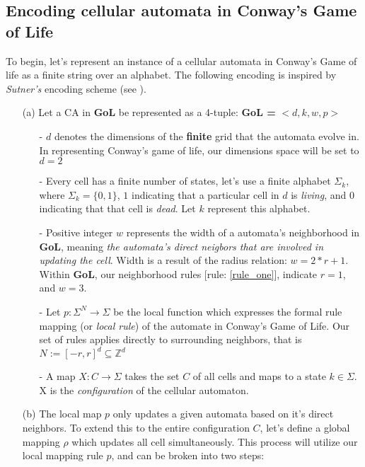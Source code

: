 \documentclass{article}
\theoremstyle{definition}
\theoremstyle{plain}
\theoremstyle{plain}
\begin{document}
\subsection{Encoding cellular automata in Conway's Game of Life}
To begin, let's represent an instance of a cellular automata in Conway's Game of life as a finite string over an alphabet. The following encoding is inspired by \textit{Sutner's} encoding scheme (see \cite{SUTNER199587}).
\begin{enumerate}
  \item[(a)] Let a CA in \textbf{GoL} be represented as a 4-tuple: \textbf{GoL = } $ <d, k, w, p> $
    \begin{enumerate}
      \item[-] $d$ denotes the dimensions of the \textbf{finite} grid that the automata evolve in. In representing Conway's game of life, our dimensions space will be set to $d = 2$
      \item[-] Every cell has a finite number of states, let's use a finite alphabet $\Sigma_k$, where $\Sigma_k = \{0,1\}$, $1$ indicating that a particular cell in $d$ is \textit{living}, and $0$ indicating that that cell is \textit{dead}. Let $k$ represent this alphabet.
      \item[-] Positive integer $w$ represents the width of a automata's neighborhood in \textbf{GoL}, meaning \textit{the automata's direct neigbors that are involved in updating the cell}. Width is a result of the radius relation: $w = 2*r +1$. Within \textbf{GoL}, our neighborhood rules [rule: \ref{rule_one}], indicate $r = 1$, and $w = 3$.
      \item[-] Let $p : \Sigma^N \to \Sigma$ be the local function which expresses the formal rule mapping (or \textit{local rule}) of the automate in Conway's Game of Life. Our set of rules applies directly to surrounding neighbors, that is$ N := [-r, r]^d \subseteq \mathbb{Z}^d $ 
      \item[-] A map $ X : C \to \Sigma $ takes the set $ C $ of all cells and maps to a state $ k \in \Sigma$. X is the \emph{configuration} of the cellular automaton.
    \end{enumerate}
      \item[(b)] The local map $p$ only updates a given automata based on it's direct neighbors. To extend this to the entire configuration $C$, let's define a global mapping $\rho$ which updates all cell simultaneously. This process will utilize our local mapping rule $p$, and  can be broken into two steps: 
        \begin{enumerate}

\end{enumerate}
\end{enumerate}
\end{document}
